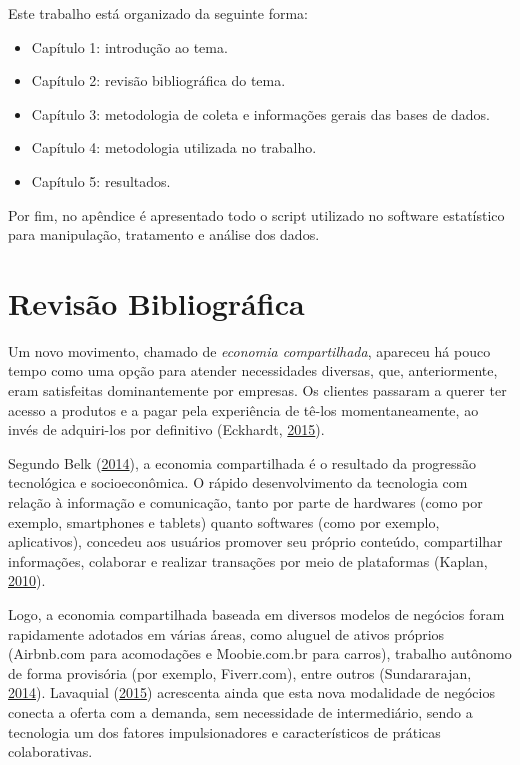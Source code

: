 \documentclass[
	12pt,				%
	a4paper,		%
	oneside,    %
	chapter=TITLE,		   %
	section=TITLE,		   %
	subsection=TITLE,	   %
	subsubsection=TITLE, %
	english,			%
	french,				%
	spanish,			%
	brazil,				%
]{abntex2}
\providecommand{\tightlist}{%
	\setlength{\itemsep}{0pt}\setlength{\parskip}{0pt}}
\begin{document}
Este trabalho está organizado da seguinte forma:

\begin{itemize}
\tightlist
\item
  Capítulo 1: introdução ao tema.
\item
  Capítulo 2: revisão bibliográfica do tema.
\item
  Capítulo 3: metodologia de coleta e informações gerais das bases de
  dados.
\item
  Capítulo 4: metodologia utilizada no trabalho.
\item
  Capítulo 5: resultados.
\end{itemize}

Por fim, no apêndice é apresentado todo o script utilizado no software
estatístico para manipulação, tratamento e análise dos dados.

\hypertarget{revisuxe3o-bibliogruxe1fica}{%
\chapter{Revisão Bibliográfica}\label{revisuxe3o-bibliogruxe1fica}}

Um novo movimento, chamado de \emph{economia compartilhada}, apareceu há
pouco tempo como uma opção para atender necessidades diversas, que,
anteriormente, eram satisfeitas dominantemente por empresas. Os clientes
passaram a querer ter acesso a produtos e a pagar pela experiência de
tê-los momentaneamente, ao invés de adquiri-los por definitivo
(Eckhardt, \protect\hyperlink{ref-eckhardt2015sharing}{2015}).

Segundo Belk (\protect\hyperlink{ref-belk2014you}{2014}), a economia
compartilhada é o resultado da progressão tecnológica e socioeconômica.
O rápido desenvolvimento da tecnologia com relação à informação e
comunicação, tanto por parte de hardwares (como por exemplo, smartphones
e tablets) quanto softwares (como por exemplo, aplicativos), concedeu
aos usuários promover seu próprio conteúdo, compartilhar informações,
colaborar e realizar transações por meio de plataformas (Kaplan,
\protect\hyperlink{ref-kaplan2010users}{2010}).

Logo, a economia compartilhada baseada em diversos modelos de negócios
foram rapidamente adotados em várias áreas, como aluguel de ativos
próprios (Airbnb.com para acomodações e Moobie.com.br para carros),
trabalho autônomo de forma provisória (por exemplo, Fiverr.com), entre
outros (Sundararajan,
\protect\hyperlink{ref-sundararajan2014peer}{2014}). Lavaquial
(\protect\hyperlink{ref-lavaquial2015cocriando}{2015}) acrescenta ainda
que esta nova modalidade de negócios conecta a oferta com a demanda, sem
necessidade de intermediário, sendo a tecnologia um dos fatores
impulsionadores e característicos de práticas colaborativas.
\end{document}
